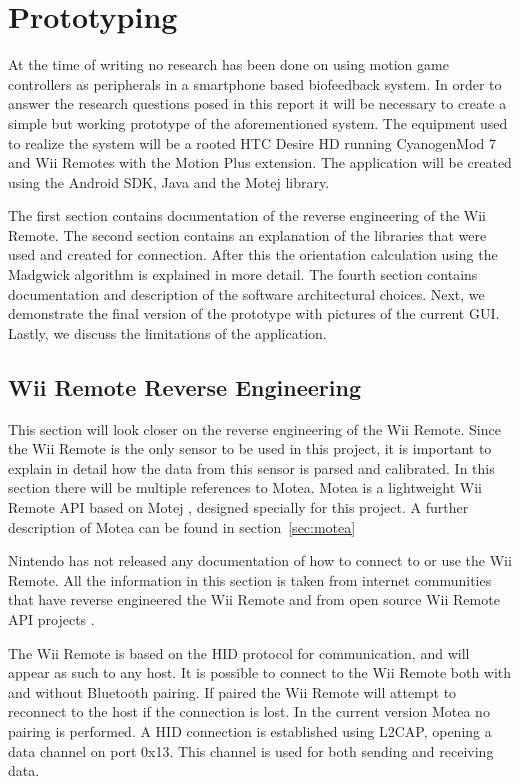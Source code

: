 \chapter{Prototyping}
At the time of writing no research has been done on using motion game controllers as peripherals in a smartphone based biofeedback system. In order to answer the research questions posed in this report it will be necessary to create a simple but working prototype of the aforementioned system. The equipment used to realize the system will be a rooted HTC Desire HD \cite{desireHdSpecs} running CyanogenMod 7 and Wii Remotes with the Motion Plus extension. The application will be created using the Android SDK, Java and the Motej library.

The first section contains documentation of the reverse engineering of the Wii Remote. The second section contains an explanation of the libraries that were used and created for connection. After this the orientation calculation using the Madgwick algorithm is explained in more detail. The fourth section contains documentation and description of the software architectural choices. Next, we demonstrate the final version of the prototype with pictures of the current GUI. Lastly, we discuss the limitations of the application.

\section{Wii Remote Reverse Engineering}
This section will look closer on the reverse engineering of the Wii Remote. Since the Wii Remote is the only sensor to be used in this project, it is important to explain in detail how the data from this sensor is parsed and calibrated. In this section there will be multiple references to Motea. Motea is a lightweight Wii Remote API based on Motej \cite{Motej}, designed specially for this project. A further description of Motea can be found in section~\ref{sec:motea}

Nintendo has not released any documentation of how to connect to or use the Wii Remote. All the information in this section is taken from internet communities \cite{wiiBrew} that have reverse engineered the Wii Remote and from open source Wii Remote API projects \cite{wiiMoteLib, Motej}.

The Wii Remote is based on the HID protocol for communication, and will appear as such to any host. It is possible to connect to the Wii Remote both with and without Bluetooth pairing. If paired the Wii Remote will attempt to reconnect to the host if the connection is lost. In the current version Motea no pairing is performed. A HID connection is established using L2CAP, opening a data channel on port 0x13. This channel is used for both sending and receiving data.

